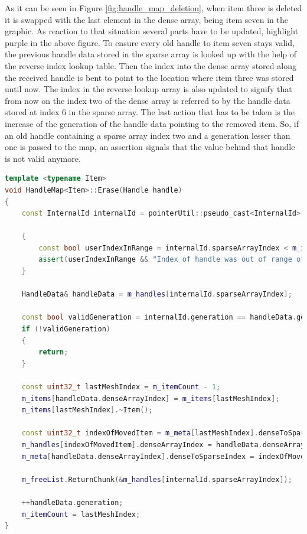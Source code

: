 \newpage
\noindent
As it can be seen in Figure \ref{fig:handle_map_deletion}, when item three is deleted it is swapped with the last element in the dense array, being item seven in the graphic. As reaction to that situation several parts have to be updated, highlight purple in the above figure. To ensure every old handle to item seven stays valid, the previous handle data stored in the sparse array is looked up with the help of the reverse index lookup table. Then the index into the dense array stored along the received handle is bent to point to the location where item three was stored until now. The index in the reverse lookup array is also updated to signify that from now on the index two of the dense array is referred to by the handle data stored at index 6 in the sparse array. The last action that has to be taken is the increase of the generation of the handle data pointing to the removed item. So, if an old handle containing a sparse array index two and a generation lesser than one is passed to the map, an assertion signals that the value behind that handle is not valid anymore.\\

\begin{lstlisting}[caption={Deletion of an item in the C++ implementation of the handle map}, label={lst:cpp_handle_map}, language={C++}]
template <typename Item>
void HandleMap<Item>::Erase(Handle handle)
{
	const InternalId internalId = pointerUtil::pseudo_cast<InternalId>(handle, 0);
	
	{
		const bool userIndexInRange = internalId.sparseArrayIndex < m_itemCount;
		assert(userIndexInRange && "Index of handle was out of range of the handle array");
	}
	
	HandleData& handleData = m_handles[internalId.sparseArrayIndex];
	
	const bool validGeneration = internalId.generation == handleData.generation;
	if (!validGeneration)
	{
		return;
	}
	
	const uint32_t lastMeshIndex = m_itemCount - 1;
	m_items[handleData.denseArrayIndex] = m_items[lastMeshIndex];
	m_items[lastMeshIndex].~Item();
	
	const uint32_t indexOfMovedItem = m_meta[lastMeshIndex].denseToSparseIndex;
	m_handles[indexOfMovedItem].denseArrayIndex = handleData.denseArrayIndex;
	m_meta[handleData.denseArrayIndex].denseToSparseIndex = indexOfMovedItem;
	
	m_freeList.ReturnChunk(&m_handles[internalId.sparseArrayIndex]);
	
	++handleData.generation;
	m_itemCount = lastMeshIndex;
}
\end{lstlisting}


